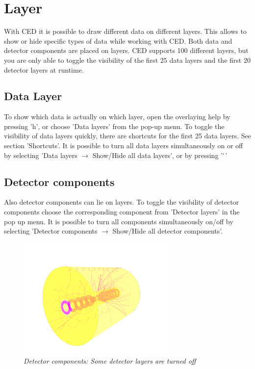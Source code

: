 \documentclass[a4paper,10pt]{article}
\begin{document}
\section{Layer}
With CED it is possible to draw different data on different layers. This allows to show or hide specific types of data while working with CED. Both data and detector components are placed on layers. CED supports 100 different layers, but you are only able to toggle the visibility of the first 25 data layers and the first 20 detector layers at runtime. 

\subsection{Data Layer}
To show which data is actually on which layer, open the overlaying help by pressing 'h', or choose 'Data layers' from the pop-up menu. To toggle the visibility of data layers quickly, there are shortcuts for the first 25 data layers. See section 'Shortcuts'. 
\newline\newline
It is possible to turn all data layers simultaneously on or off by selecting 'Data layers $\rightarrow$ Show/Hide all data layers', or by pressing '$`$'

\subsection{Detector components}
Also detector components can lie on layers. To toggle the visibility of detector components choose the corresponding component from 'Detector layers' in the pop up menu. It is possible to turn all components simultaneously on/off by selecting 'Detector components $\rightarrow$ Show/Hide all detector components'. 

\begin{figure}[h]
\centerline{\includegraphics[height=6cm]{detector_layer.png}}
\caption{\label{detectorlayer} \textsl{Detector components: Some detector layers are turned off}}
\end{figure}
\end{document}
